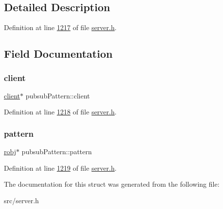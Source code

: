\subsection{Detailed Description}


Definition at line \hyperlink{server_8h_source_l01217}{1217} of file \hyperlink{server_8h_source}{server.\+h}.



\subsection{Field Documentation}
\mbox{\label{structpubsubPattern_a36ce52bc3e69ad3f037fd53229e8cb4c}} 
\subsubsection{\texorpdfstring{client}{client}}
{\footnotesize\ttfamily \hyperlink{structclient}{client}$\ast$ pubsub\+Pattern\+::client}



Definition at line \hyperlink{server_8h_source_l01218}{1218} of file \hyperlink{server_8h_source}{server.\+h}.

\mbox{\label{structpubsubPattern_a16ff666d589b8b1c105eae5b430aebac}} 
\subsubsection{\texorpdfstring{pattern}{pattern}}
{\footnotesize\ttfamily \hyperlink{structredisObject}{robj}$\ast$ pubsub\+Pattern\+::pattern}



Definition at line \hyperlink{server_8h_source_l01219}{1219} of file \hyperlink{server_8h_source}{server.\+h}.



The documentation for this struct was generated from the following file\+:\begin{DoxyCompactItemize}
\item 
src/server.\+h\end{DoxyCompactItemize}
